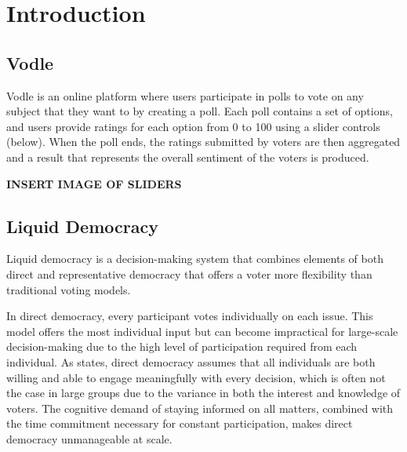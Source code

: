 \chapter{Introduction}
\label{ch:introduction}


\section{Vodle}
Vodle is an online platform where users participate in polls to vote on any subject that they want to by creating a poll. Each poll contains a set of options, and users provide ratings for each option from 0 to 100 using a slider controls (below). When the poll ends, the ratings submitted by voters are then aggregated and a result that represents the overall sentiment of the voters is produced.

\textbf{INSERT IMAGE OF SLIDERS}

\section{Liquid Democracy}
Liquid democracy is a decision-making system that combines elements of both direct and representative democracy that offers a voter more flexibility than traditional voting models.

In direct democracy, every participant votes individually on each issue. This model offers the most individual input but can become impractical for large-scale decision-making due to the high level of participation required from each individual. As \cite{ford_delegative_2002} states, direct democracy assumes that all individuals are both willing and able to engage meaningfully with every decision, which is often not the case in large groups due to the variance in both the interest and knowledge of voters. The cognitive demand of staying informed on all matters, combined with the time commitment necessary for constant participation, makes direct democracy unmanageable at scale.

